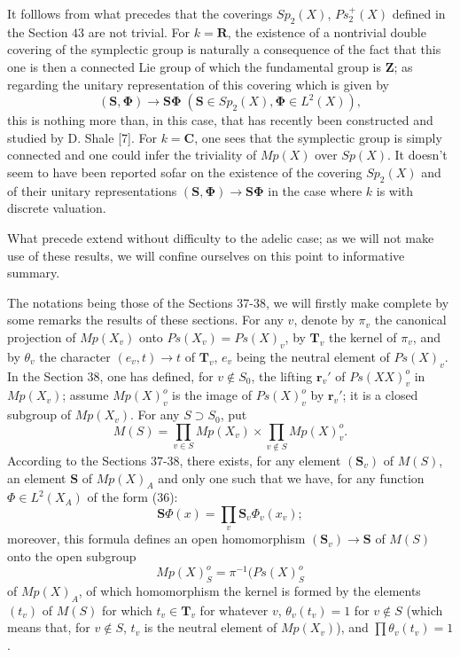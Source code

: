 \documentclass[12pt]{amsart}
\newcounter{ssection}
\renewcommand{\subsection}{
  \addtocounter{ssection}{1}{\bf  \arabic{ssection}.\  }}
\begin{document}
It folllows from what precedes that the coverings $Sp_{2}(X)$, $Ps_{2}^{+}(X)$
defined in the Section $43$ are not trivial. For $k=\mathbf{R}$,
the existence of a nontrivial double covering of the symplectic group
is naturally a consequence of the fact that this one is then a connected
Lie group of which the fundamental group is $\mathbf{Z}$; as regarding
the unitary representation of this covering which is given by\[
(\mathbf{S},\mathbf{\Phi})\to\mathbf{S}\mathbf{\mathbf{\Phi}}\;(\mathbf{S}\in Sp_{2}(X),\mathbf{\Phi}\in L^{2}(X)),\]
this is nothing more than, in this case, that has recently been constructed
and studied by D. Shale {[}7{]}. For $k=\mathbf{C}$, one sees that
the symplectic group is simply connected and one could infer the triviality
of $Mp(X)$ over $Sp(X)$. It doesn't seem to have been reported sofar
on the existence of the covering $Sp_{2}(X)$ and of their unitary
representations $(\mathbf{S},\mathbf{\Phi})\to\mathbf{S}\mathbf{\Phi}$
in the case where $k$ is with discrete valuation.


\subsection{}

What precede extend without difficulty to the adelic case; as we will
not make use of these results, we will confine ourselves on this point
to informative summary.

The notations being those of the Sections $37$-$38$, we will firstly
make complete by some remarks the results of these sections. For any
$v$, denote by $\pi_{v}$ the canonical projection of $Mp(X_{v})$
onto $Ps(X_{v})=Ps(X)_{v}$, by $\mathbf{T}_{v}$ the kernel of $\pi_{v}$,
and by $\theta_{v}$ the character $(e_{v},t)\to t$ of $\mathbf{T}_{v}$,
$e_{v}$ being the neutral element of $Ps(X)_{v}$. In the Section
$38$, one has defined, for $v\notin S_{0}$, the lifting $\mathbf{r}_{v}'$
of $Ps(XX)_{v}^{o}$ in $Mp(X_{v})$; assume $Mp(X)_{v}^{o}$ is the
image of $Ps(X)_{v}^{o}$ by $\mathbf{r}_{v}'$; it is a closed subgroup
of $Mp(X_{v})$. For any $S\supset S_{0}$, put\[
M(S)=\prod_{v\in S}Mp(X_{v})\times\prod_{v\notin S}Mp(X)_{v}^{o}.\]
According to the Sections $37$-$38$, there exists, for any element
$(\mathbf{S}_{v})$ of $M(S)$, an element $\mathbf{S}$ of $Mp(X)_{A}$
and only one such that we have, for any function $\Phi\in L^{2}(X_{A})$
of the form (36):\begin{equation}
\mathbf{S}\Phi(x)=\prod_{v}\mathbf{S}_{v}\Phi_{v}(x_{v});\label{41}\end{equation}
moreover, this formula defines an open homomorphism $(\mathbf{S}_{v})\to\mathbf{S}$
of $M(S)$ onto the open subgroup\[
Mp(X)_{S}^{o}=\pi^{-1}(Ps(X)_{S}^{o}\]
of $Mp(X)_{A}$, of which homomorphism the kernel is formed by the
elements $(t_{v})$ of $M(S)$ for which $t_{v}\in\mathbf{T}_{v}$
for whatever $v$, $\theta_{v}(t_{v})=1$ for $v\notin S$ (which
means that, for $v\notin S$, $t_{v}$ is the neutral element of $Mp(X_{v})$),
and $\prod\theta_{v}(t_{v})=1$.
\end{document}
